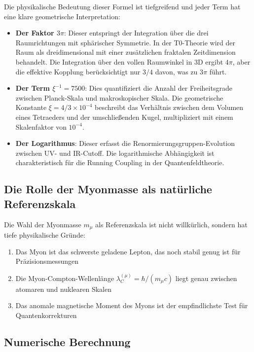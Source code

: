 \documentclass[12pt,a4paper]{article}
\theoremstyle{definition}
\begin{document}
	Die physikalische Bedeutung dieser Formel ist tiefgreifend und jeder Term hat eine klare geometrische Interpretation:
	
	\begin{itemize}
		\item \textbf{Der Faktor $3\pi$}: Dieser entspringt der Integration über die drei Raumrichtungen mit sphärischer Symmetrie. In der T0-Theorie wird der Raum als dreidimensional mit einer zusätzlichen fraktalen Zeitdimension behandelt. Die Integration über den vollen Raumwinkel in 3D ergibt $4\pi$, aber die effektive Kopplung berücksichtigt nur $3/4$ davon, was zu $3\pi$ führt.
		
		\item \textbf{Der Term $\xi^{-1} = 7500$}: Dies quantifiziert die Anzahl der Freiheitsgrade zwischen Planck-Skala und makroskopischer Skala. Die geometrische Konstante $\xi = 4/3 \times 10^{-4}$ beschreibt das Verhältnis zwischen dem Volumen eines Tetraeders und der umschließenden Kugel, multipliziert mit einem Skalenfaktor von $10^{-4}$.
		
		\item \textbf{Der Logarithmus}: Dieser erfasst die Renormierungsgruppen-Evolution zwischen UV- und IR-Cutoff. Die logarithmische Abhängigkeit ist charakteristisch für die Running Coupling in der Quantenfeldtheorie.
	\end{itemize}
	
	\subsection{Die Rolle der Myonmasse als natürliche Referenzskala}
	
	Die Wahl der Myonmasse $m_{\mu}$ als Referenzskala ist nicht willkürlich, sondern hat tiefe physikalische Gründe:
	
	\begin{enumerate}
		\item Das Myon ist das schwerste geladene Lepton, das noch stabil genug ist für Präzisionsmessungen
		\item Die Myon-Compton-Wellenlänge $\lambda_C^{(\mu)} = \hbar/(m_\mu c)$ liegt genau zwischen atomaren und nuklearen Skalen
		\item Das anomale magnetische Moment des Myons ist der empfindlichste Test für Quantenkorrekturen
	\end{enumerate}
	
	\subsection{Numerische Berechnung}
	
\end{document}
